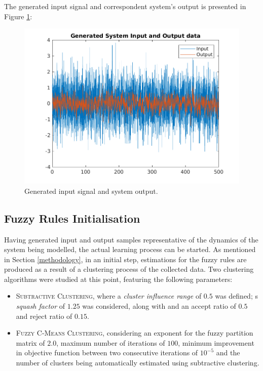 \documentclass[11pt]{article}
\begin{document}
The generated input signal and correspondent system's output is presented in Figure \ref{generated_input_output}:

\begin{figure}[ht]
	\centering
	\includegraphics[scale=0.5]{images/randomInputOutput.png}
	\caption{Generated input signal and system output.}
	\label{generated_input_output}
\end{figure}


\subsection{Fuzzy Rules Initialisation}

Having generated input and output samples representative of the dynamics of the system being modelled, the actual learning process can be started. As mentioned in Section \ref{methodology}, in an initial step, estimations for the fuzzy rules are produced as a result of a clustering process of the collected data. Two clustering algorithms were studied at this point, featuring the following parameters:

\begin{itemize}
	\item \textsc{Subtractive Clustering}, where a \emph{cluster influence range} of $0.5$ was defined; s \emph{squash factor} of $1.25$ was considered, along with and an accept ratio of $0.5$ and reject ratio of $0.15$.
	
	\item \textsc{Fuzzy C-Means Clustering}, considering an exponent for the fuzzy partition matrix of $2.0$, maximum number of iterations of $100$, minimum improvement in objective function between two consecutive iterations of $10^{-5}$ and the number of clusters being automatically estimated using subtractive clustering.
\end{itemize}
\end{document}

